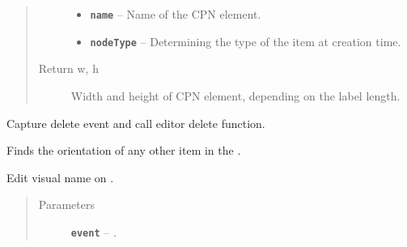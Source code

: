 \documentclass[a4paper,10pt,english]{sphinxmanual}
\begin{document}
\begin{fulllineitems}
\begin{fulllineitems}
\begin{quote}
\begin{description}
\begin{itemize}
\item {} 
\textbf{\texttt{name}} -- Name of the CPN element.

\item {} 
\textbf{\texttt{nodeType}} -- Determining the type of the item at creation time.

\end{itemize}

\item[{Return w, h}] \leavevmode
Width and height of CPN element, depending on the label length.

\end{description}\end{quote}

\end{fulllineitems}


\begin{fulllineitems}
\label{model_link:model.AbstractItem.AbstractItem.deleteItemLocal}
Capture delete event and call editor delete function.

\end{fulllineitems}


\begin{fulllineitems}
\label{model_link:model.AbstractItem.AbstractItem.findItemsInPlanes}
Finds the orientation of any other item in the .

\end{fulllineitems}


\begin{fulllineitems}
\label{model_link:model.AbstractItem.AbstractItem.mouseDoubleClickEvent}
Edit visual name on .
\begin{quote}\begin{description}
\item[{Parameters}] \leavevmode
\textbf{\texttt{event}} -- .

\end{description}\end{quote}


\end{fulllineitems}
\end{fulllineitems}
\end{document}
